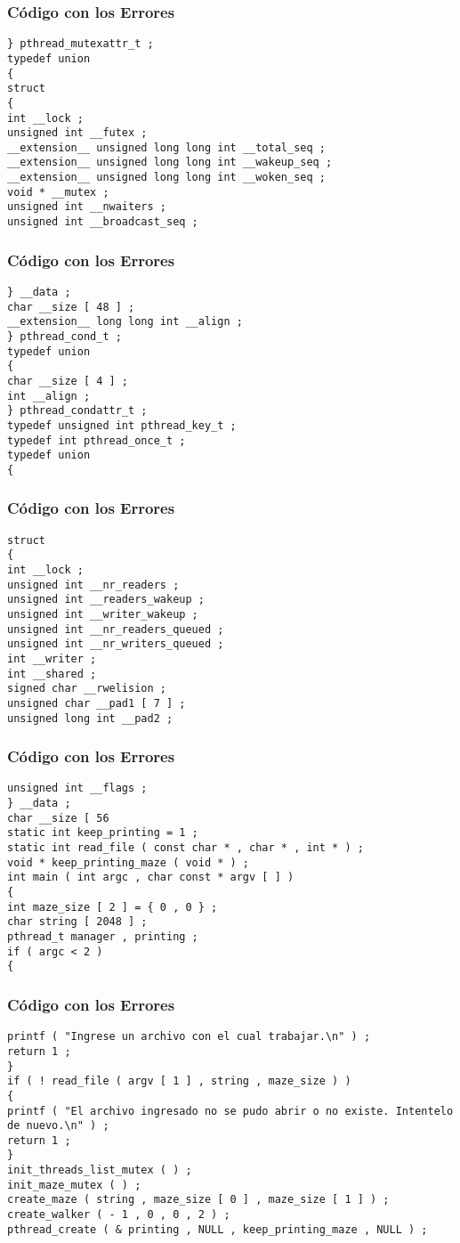 \documentclass{beamer}
\begin{document}
\begin{frame}[fragile]
\frametitle{C\'odigo con los Errores}
\begin{lstlisting}[style=CStyle]
} pthread_mutexattr_t ; 
typedef union 
{ 
struct 
{ 
int __lock ; 
unsigned int __futex ; 
__extension__ unsigned long long int __total_seq ; 
__extension__ unsigned long long int __wakeup_seq ; 
__extension__ unsigned long long int __woken_seq ; 
void * __mutex ; 
unsigned int __nwaiters ; 
unsigned int __broadcast_seq ; 
\end{lstlisting}
\end{frame}
\begin{frame}[fragile]
\frametitle{C\'odigo con los Errores}
\begin{lstlisting}[style=CStyle]
} __data ; 
char __size [ 48 ] ; 
__extension__ long long int __align ; 
} pthread_cond_t ; 
typedef union 
{ 
char __size [ 4 ] ; 
int __align ; 
} pthread_condattr_t ; 
typedef unsigned int pthread_key_t ; 
typedef int pthread_once_t ; 
typedef union 
{ 
\end{lstlisting}
\end{frame}
\begin{frame}[fragile]
\frametitle{C\'odigo con los Errores}
\begin{lstlisting}[style=CStyle]
struct 
{ 
int __lock ; 
unsigned int __nr_readers ; 
unsigned int __readers_wakeup ; 
unsigned int __writer_wakeup ; 
unsigned int __nr_readers_queued ; 
unsigned int __nr_writers_queued ; 
int __writer ; 
int __shared ; 
signed char __rwelision ; 
unsigned char __pad1 [ 7 ] ; 
unsigned long int __pad2 ; 
\end{lstlisting}
\end{frame}
\begin{frame}[fragile]
\frametitle{C\'odigo con los Errores}
\begin{lstlisting}[style=CStyle]
unsigned int __flags ; 
} __data ; 
char __size [ 56 
static int keep_printing = 1 ; 
static int read_file ( const char * , char * , int * ) ; 
void * keep_printing_maze ( void * ) ; 
int main ( int argc , char const * argv [ ] ) 
{ 
int maze_size [ 2 ] = { 0 , 0 } ; 
char string [ 2048 ] ; 
pthread_t manager , printing ; 
if ( argc < 2 ) 
{ 
\end{lstlisting}
\end{frame}
\begin{frame}[fragile]
\frametitle{C\'odigo con los Errores}
\begin{lstlisting}[style=CStyle]
printf ( "Ingrese un archivo con el cual trabajar.\n" ) ; 
return 1 ; 
} 
if ( ! read_file ( argv [ 1 ] , string , maze_size ) ) 
{ 
printf ( "El archivo ingresado no se pudo abrir o no existe. Intentelo de nuevo.\n" ) ; 
return 1 ; 
} 
init_threads_list_mutex ( ) ; 
init_maze_mutex ( ) ; 
create_maze ( string , maze_size [ 0 ] , maze_size [ 1 ] ) ; 
create_walker ( - 1 , 0 , 0 , 2 ) ; 
pthread_create ( & printing , NULL , keep_printing_maze , NULL ) ; 
\end{lstlisting}
\end{frame}
\end{document}
